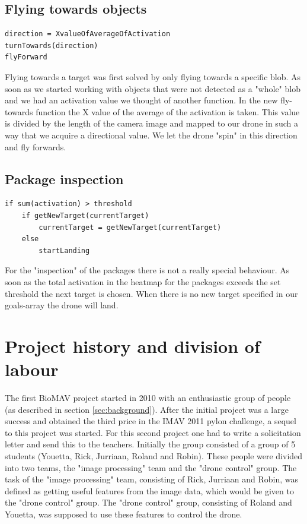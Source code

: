 \documentclass[a4paper,10pt]{article}
\begin{document}
\subsection{Flying towards objects\label{flytowards}}
\begin{verbatim}
direction = XvalueOfAverageOfActivation
turnTowards(direction)
flyForward
\end{verbatim}

Flying towards a target was first solved by only flying towards a specific blob. 
As soon as we started working with objects that were not detected as a "whole" blob and we had an activation value we thought of another function. 
In the new fly-towards function the X value of the average of the activation is taken.
This value is divided by the length of the camera image and mapped to our drone in such a way that we acquire a directional value. 
We let the drone "spin" in this direction and fly forwards. 

\subsection{Package inspection\label{sec:packageinspection}}
\begin{verbatim}
if sum(activation) > threshold
    if getNewTarget(currentTarget)
        currentTarget = getNewTarget(currentTarget)
    else
        startLanding
\end{verbatim}

For the "inspection" of the packages there is not a really special behaviour. 
As soon as the total activation in the heatmap for the packages exceeds the set threshold the next target is chosen. 
When there is no new target specified in our goals-array the drone will land. 

\section{Project history and division of labour}
\label{sec:projecthistory}
The first BioMAV project started in 2010 with an enthusiastic group of people (as described in section \ref{sec:background}). 
After the initial project was a large success and obtained the third price in the IMAV 2011 pylon challenge, a sequel to this project was started.
For this second project one had to write a solicitation letter and send this to the teachers. 
Initially the group consisted of a group of 5 students (Youetta, Rick, Jurriaan, Roland and Robin).  
These people were divided into two teams, the "image processing" team and the "drone control" group. 
The task of the "image processing" team, consisting of Rick, Jurriaan and Robin, was defined as getting useful features from the image data, which would be given to the "drone control" group.
The "drone control" group, consisting of Roland and Youetta, was supposed to use these features to control the drone. 
\end{document}
